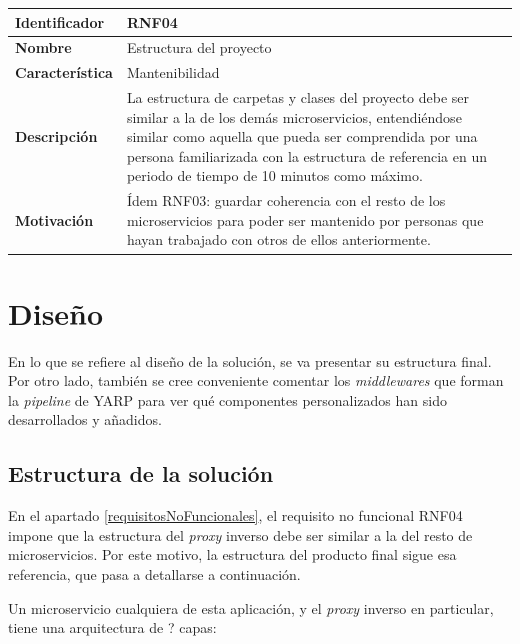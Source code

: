 \documentclass[11pt,spanish,listoffigures]{tfgetsinf}
\begin{document}
\begin{center} \begin{tabular}{| l | p{11.3cm} |}
\hline
\textbf{Identificador} & RNF04
\\ \hline
\textbf{Nombre} & Estructura del proyecto
\\ \hline
\textbf{Característica} & Mantenibilidad
\\ \hline
\textbf{Descripción} & La estructura de carpetas y clases del proyecto debe ser similar a la de los demás microservicios, entendiéndose similar como aquella que pueda ser comprendida por una persona familiarizada con la estructura de referencia en un periodo de tiempo de 10 minutos como máximo.
\\ \hline
\textbf{Motivación} & Ídem RNF03: guardar coherencia con el resto de los microservicios para poder ser mantenido por personas que hayan trabajado con otros de ellos anteriormente.
\\ \hline \end{tabular} \end{center}


	\section{Diseño}

En lo que se refiere al diseño de la solución, se va presentar su estructura final. Por otro lado, también se cree conveniente comentar los \emph{middlewares} que forman la \emph{pipeline} de YARP para ver qué componentes personalizados han sido desarrollados y añadidos.


		\subsection{Estructura de la solución}

En el apartado \ref{requisitosNoFuncionales}, el requisito no funcional RNF04 impone que la estructura del \emph{proxy} inverso debe ser similar a la del resto de microservicios. Por este motivo, la estructura del producto final sigue esa referencia, que pasa a detallarse a continuación.

Un microservicio cualquiera de esta aplicación, y el \emph{proxy} inverso en particular, tiene una arquitectura de ? capas:
\end{document}
